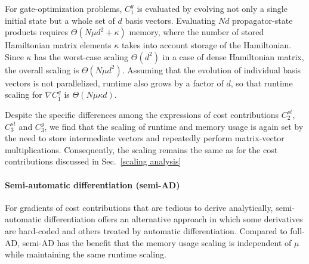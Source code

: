 \documentclass[12pt]{article}
\begin{document}
For gate-optimization problems, $C_1^{ g}$ is evaluated by evolving not only a single initial state but a whole set of $d$ basis vectors. Evaluating $Nd$ propagator-state products requires $\Theta(N\mu d^2+\kappa)$ memory, where the number of stored Hamiltonian matrix elements  $\kappa$ takes into account storage of the Hamiltonian. Since $\kappa$ has the worst-case scaling $\Theta(d^2)$ in a case of dense Hamiltonian matrix, the overall scaling is $\Theta(N\mu d^2)$. Assuming that the evolution of individual basis vectors is not parallelized, runtime also grows by a factor of $d$, so that runtime scaling for $\nabla C_1^{ g}$ is $\Theta(N\mu\kappa d)$.

Despite the specific differences among the expressions of cost contributions $C_2^{st}$, $C_3^{st}$ and $C_3^{g}$, we find that the scaling of runtime and memory usage is again set by the need to store intermediate vectors and repeatedly perform matrix-vector multiplications. Consequently, the scaling remains the same as for the cost contributions discussed in Sec.\ \ref{scaling analysis}

\paragraph{Semi-automatic differentiation (semi-AD)}
For gradients of cost contributions that are tedious to derive analytically, semi-automatic differentiation \cite{semiadgoerz2022quantum} offers an alternative approach in which some derivatives are hard-coded and others treated by automatic differentiation. Compared to full-AD, semi-AD has the benefit that the memory usage scaling is independent of $\mu$ while maintaining the same runtime scaling. 
\end{document}
